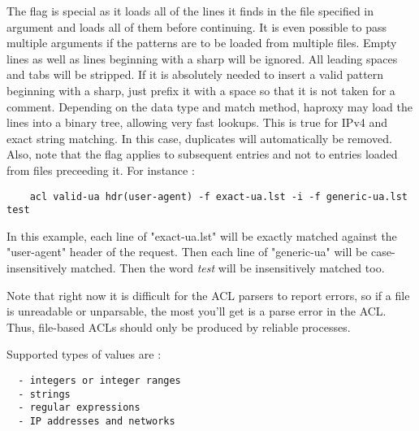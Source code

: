 The  flag is special as it loads all of the lines it finds in the file
specified in argument and loads all of them before continuing. It is even
possible to pass multiple  arguments if the patterns are to be loaded from
multiple files. Empty lines as well as lines beginning with a sharp \CHAR{\#} will
be ignored. All leading spaces and tabs will be stripped. If it is absolutely
needed to insert a valid pattern beginning with a sharp, just prefix it with a
space so that it is not taken for a comment. Depending on the data type and
match method, haproxy may load the lines into a binary tree, allowing very fast
lookups. This is true for IPv4 and exact string matching. In this case,
duplicates will automatically be removed. Also, note that the  flag applies
to subsequent entries and not to entries loaded from files preceeding it. For
instance :

\begin{verbatim}
    acl valid-ua hdr(user-agent) -f exact-ua.lst -i -f generic-ua.lst  test
\end{verbatim}


In this example, each line of "exact-ua.lst" will be exactly matched against
the "user-agent" header of the request. Then each line of "generic-ua" will be
case-insensitively matched. Then the word \emph{test} will be insensitively matched
too.


Note that right now it is difficult for the ACL parsers to report errors, so if
a file is unreadable or unparsable, the most you'll get is a parse error in the
ACL. Thus, file-based ACLs should only be produced by reliable processes.


Supported types of values are :

\begin{verbatim}
  - integers or integer ranges
  - strings
  - regular expressions
  - IP addresses and networks
\end{verbatim}


